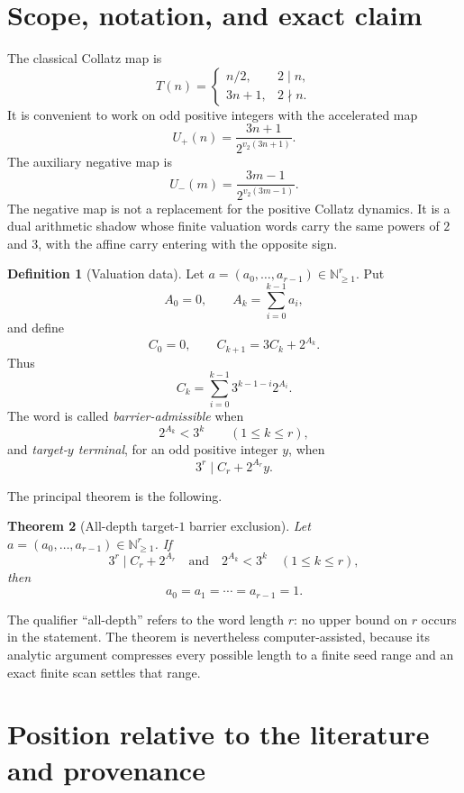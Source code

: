 \documentclass[11pt]{article}
\newtheorem{theorem}{Theorem}[section]
\theoremstyle{definition}
\newtheorem{definition}[theorem]{Definition}
\theoremstyle{remark}
\newcommand{\N}{\mathbb N}
\newcommand{\Up}{U_{+}}
\newcommand{\Um}{U_{-}}
\newcommand{\vTwo}{v_2}
\begin{document}
\tableofcontents
\newpage

\section{Scope, notation, and exact claim}\label{sec:scope}

The classical Collatz map is
\[
 T(n)=\begin{cases}
 n/2,&2\mid n,\\
 3n+1,&2\nmid n.
 \end{cases}
\]
It is convenient to work on odd positive integers with the accelerated map
\[
 \Up(n)=\frac{3n+1}{2^{\vTwo(3n+1)}}.
\]
The auxiliary negative map is
\[
 \Um(m)=\frac{3m-1}{2^{\vTwo(3m-1)}}.
\]
The negative map is not a replacement for the positive Collatz dynamics.  It
is a dual arithmetic shadow whose finite valuation words carry the same
powers of $2$ and $3$, with the affine carry entering with the opposite sign.

\begin{definition}[Valuation data]
Let $a=(a_0,\ldots,a_{r-1})\in\N_{\ge1}^r$.  Put
\[
 A_0=0,\qquad A_k=\sum_{i=0}^{k-1}a_i,
\]
and define
\[
 C_0=0,\qquad C_{k+1}=3C_k+2^{A_k}.
\]
Thus
\[
 C_k=\sum_{i=0}^{k-1}3^{k-1-i}2^{A_i}.
\]
The word is called \emph{barrier-admissible} when
\[
 2^{A_k}<3^k\qquad(1\le k\le r),                  \tag{1.1}
\]
and \emph{target-$y$ terminal}, for an odd positive integer $y$, when
\[
 3^r\mid C_r+2^{A_r}y.                              \tag{1.2}
\]
\end{definition}

The principal theorem is the following.

\begin{theorem}[All-depth target-$1$ barrier exclusion]\label{thm:main}
Let $a=(a_0,\ldots,a_{r-1})\in\N_{\ge1}^r$.  If
\[
 3^r\mid C_r+2^{A_r}
 \quad\text{and}\quad
 2^{A_k}<3^k\quad(1\le k\le r),
\]
then
\[
 a_0=a_1=\cdots=a_{r-1}=1.
\]
\end{theorem}

The qualifier ``all-depth'' refers to the word length $r$: no upper bound on
$r$ occurs in the statement.  The theorem is nevertheless computer-assisted,
because its analytic argument compresses every possible length to a finite
seed range and an exact finite scan settles that range.

\section{Position relative to the literature and provenance}\label{sec:literature}
\end{document}
